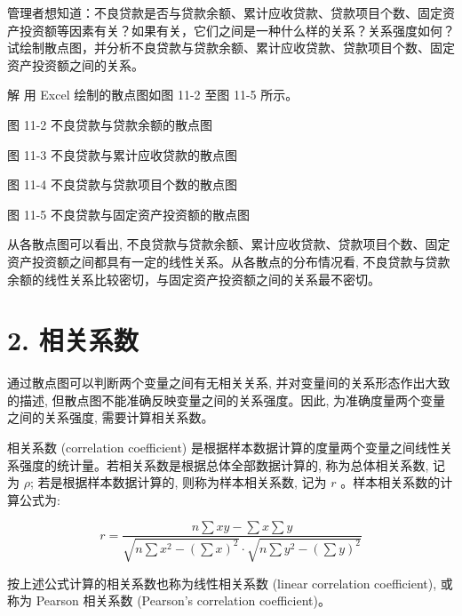 \documentclass[10pt]{article}
\begin{document}
\begin{CJK*}{UTF8}{bsmi}
管理者想知道：不良贷款是否与贷款余额、累计应收贷款、贷款项目个数、固定资产投资额等因素有关？如果有关，它们之间是一种什么样的关系？关系强度如何？试绘制散点图，并分析不良贷款与贷款余额、累计应收贷款、贷款项目个数、固定资产投资额之间的关系。

解 用 Excel 绘制的散点图如图 11-2 至图 11-5 所示。

\begin{center}
\end{center}

图 11-2 不良贷款与贷款余额的散点图

\begin{center}
\end{center}

图 11-3 不良贷款与累计应收贷款的散点图

\begin{center}
\end{center}

图 11-4 不良贷款与贷款项目个数的散点图

\begin{center}
\end{center}

图 11-5 不良贷款与固定资产投资额的散点图

从各散点图可以看出, 不良贷款与贷款余额、累计应收贷款、贷款项目个数、固定资产投资额之间都具有一定的线性关系。从各散点的分布情况看, 不良贷款与贷款余额的线性关系比较密切，与固定资产投资额之间的关系最不密切。

\section*{2. 相关系数}
通过散点图可以判断两个变量之间有无相关关系, 并对变量间的关系形态作出大致的描述, 但散点图不能准确反映变量之间的关系强度。因此, 为准确度量两个变量之间的关系强度, 需要计算相关系数。

相关系数 (correlation coefficient) 是根据样本数据计算的度量两个变量之间线性关系强度的统计量。若相关系数是根据总体全部数据计算的, 称为总体相关系数, 记为 $\rho$; 若是根据样本数据计算的, 则称为样本相关系数, 记为 $r$ 。样本相关系数的计算公式为:


\begin{equation*}
r=\frac{n \sum x y-\sum x \sum y}{\sqrt{n \sum x^{2}-\left(\sum x\right)^{2}} \cdot \sqrt{n \sum y^{2}-\left(\sum y\right)^{2}}} \tag{11.1}
\end{equation*}


按上述公式计算的相关系数也称为线性相关系数 (linear correlation coefficient), 或称为 Pearson 相关系数 (Pearson's correlation coefficient)。


\end{CJK*}
\end{document}
